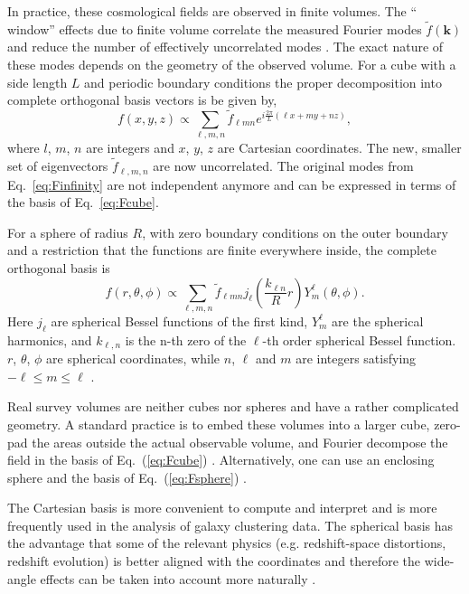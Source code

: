 \documentclass[fleqn,usenatbib]{mnras}
\begin{document}
In practice, these cosmological fields are observed in finite volumes. The ``
window'' effects due to finite volume correlate the measured Fourier modes
$\tilde{f}(\bm{k})$ and reduce the number of effectively uncorrelated modes
\citep{1991MNRAS.253..307P}.  The exact nature of these modes depends on the
geometry of the observed volume.  For a cube with a side length $L$ and
periodic boundary conditions the proper decomposition into complete orthogonal
basis vectors is be given by,
\begin{equation}
\label{eq:Fcube}
f(x,y,z)\propto
\displaystyle\sum_{\ell,m,n}\tilde{f}_{\ell m n}e^{i\frac{2\pi}{L}\left(\ell x
+ my + nz\right)},
\end{equation}
\noindent
where $l$, $m$, $n$ are integers and $x$, $y$, $z$ are Cartesian coordinates.
The new, smaller set of eigenvectors $\tilde{f}_{\ell,m,n}$ are now
uncorrelated. The original modes from Eq.~\eqref{eq:Finfinity} are not
independent anymore and can be expressed in terms of the basis of
Eq.~\eqref{eq:Fcube}.

For a sphere of radius $R$, with zero boundary conditions on the outer
boundary and a restriction that the functions are finite everywhere inside, the
complete orthogonal basis is
\begin{equation}
\label{eq:Fsphere}
f(r,\theta,\phi) \propto \displaystyle\sum_{\ell,m,n} \tilde{f}_{\ell m n}j_\ell\left(\frac{k_{\ell n}}
{R}r\right)Y^\ell_m
(\theta,\phi).
\end{equation}
\noindent
Here $j_\ell$ are spherical Bessel functions of the first kind, $Y^\ell_m$ are
the spherical harmonics, and $k_{\ell,n}$ is the n-th zero of the $\ell$-th
order spherical Bessel function. $r$, $\theta$, $\phi$ are spherical
coordinates, while $n$, $\ell$ and $m$ are integers satisfying $-\ell \leq m
\leq \ell$ \citep[see e.g.,][]{1995MNRAS.275..483H}.

Real survey volumes are neither cubes nor spheres and have a rather complicated
geometry. A standard practice is to embed these volumes into a larger cube,
zero-pad the areas outside the actual observable volume, and Fourier decompose
the field in the basis of Eq.~(\ref{eq:Fcube})
\citep{1994ApJ...426...23F,1995ApJ...455..429T}.  Alternatively, one can use an
enclosing sphere and the basis of Eq.~(\ref{eq:Fsphere})
\citep{2012A&A...540A..60L}. 

The Cartesian basis is more convenient to compute and interpret and is more
frequently used in the analysis of galaxy clustering data. The spherical basis
has the advantage that some of the relevant physics (e.g. redshift-space
distortions, redshift evolution) is better aligned with the coordinates and
therefore the wide-angle effects can be taken into account more naturally
\citep{2015MNRAS.452.3704S,2015MNRAS.447.1789Y}.
\end{document}
